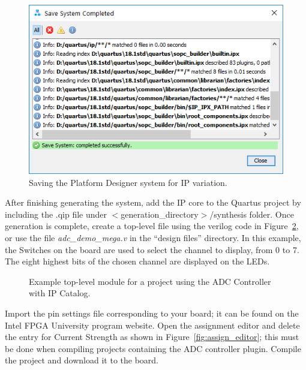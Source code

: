 \documentclass[11pt, twoside, pdftex]{article}
\begin{document}
\begin {figure} [H]
\begin {center}
\includegraphics [scale = 0.5] {figures/ipcatalog4.png}
\end {center}
\caption {Saving the Platform Designer system for IP variation.}
\label {fig:ipcatalog4}
\end {figure}

After finishing generating the system, add the IP core to the Quartus project by including the .qip file under $<$generation\_directory$>$/synthesis folder.
Once generation is complete, create a top-level file using the verilog code in Figure~\ref{fig:mega_top}, or use the file \textit{adc\_demo\_mega.v} in the ``design files'' directory. In this example, the Switches on the board are used to select the channel to display, from 0 to 7. The eight highest bits of the chosen channel are displayed on the LEDs. \\
\newpage
\begin{figure} [H]
	
	\caption{Example top-level module for a project using the ADC Controller with IP Catalog.}
	\label{fig:mega_top}
\end{figure}

Import the pin settings file corresponding to your board; it can be found on the Intel FPGA University program website. Open the assignment editor and delete the entry for Current Strength as shown in Figure~\ref{fig:assign_editor}; this must be done when compiling projects containing the ADC controller plugin. Compile the project and download it to the board.
\end{document}
